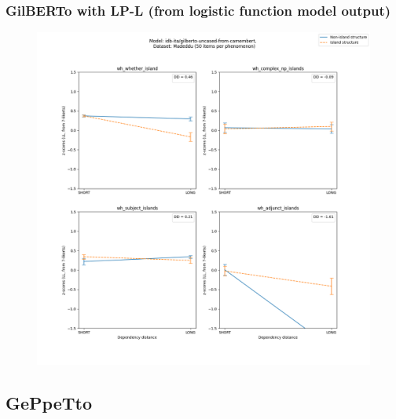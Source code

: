 \subsubsection{GilBERTo with LP-L (from logistic function model output)}
\begin{figure}[h]
	\centering
	\includegraphics[width=1\textwidth]{images/AppendixA/Madeddu_wh_idb-ita_gilberto-uncased-from-camembert_LL-zscores-likert-2022-07-11.png} 
\end{figure}

\clearpage
\subsection{GePpeTto}


